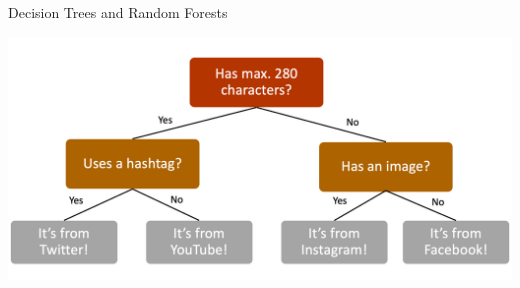 \documentclass[handout]{beamer}
\begin{document}
\begin{frame}{Decision Trees and Random Forests}
	
	\begin{center}
		\includegraphics[width=\linewidth,height=\textheight,keepaspectratio]{../pictures/decisiontree.png} \\\
	\end{center}
	
	
	
	
	
	
	
	
\end{frame}
\end{document}
